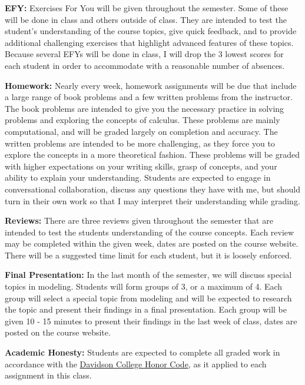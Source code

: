 \documentclass[11pt, a4paper]{article}
\begin{document}
\vspace*{0.5em}
\noindent\textbf{EFY:}
Exercises For You will be given throughout the semester. Some of these will be done in class and others outside of class. They are intended to test the student's understanding of the course topics, give quick feedback, and to provide additional challenging exercises that highlight advanced features of these topics. Because several EFYs will be done in class, I will drop the 3 lowest scores for each student in order to accommodate with a reasonable number of absences. 

\vspace*{0.5em}
\noindent\textbf{Homework:}
Nearly every week, homework assignments will be due that include a large range of book problems and a few written problems from the instructor. The book problems are intended to give you the necessary practice in solving problems and exploring the concepts of calculus. These problems are mainly computational, and will be graded largely on completion and accuracy. The written problems are intended to be more challenging, as they force you to explore the concepts in a more theoretical fashion. These problems will be graded with higher expectations on your writing skills, grasp of concepts, and your ability to explain your understanding. Students are expected to engage in conversational collaboration, discuss any questions they have with me, but should turn in their own work so that I may interpret their understanding while grading. 

\vspace*{0.5em}
\noindent\textbf{Reviews:}
There are three reviews given throughout the semester that are intended to test the students understanding of the course concepts. Each review may be completed within the given week, dates are posted on the course website. There will be a suggested time limit for each student, but it is loosely enforced. 

\vspace*{0.5em}
\noindent\textbf{Final Presentation:}
In the last month of the semester, we will discuss special topics in modeling. Students will form groups of 3, or a maximum of 4. Each group will select a special topic from modeling and will be expected to research the topic and present their findings in a final presentation. Each group will be given 10 - 15 minutes to present their findings in the last week of class, dates are posted on the course website. 

\vspace*{0.5em}
\noindent\textbf{Academic Honesty:} 
Students are expected to complete all graded work in accordance
with the \href{http://www.davidson.edu/about/distinctly-davidson/honor-code}{Davidson College Honor Code}, as it applied to each assignment in this class. 
\end{document}
